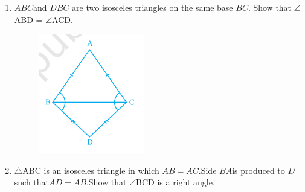 \documentclass[12pt]{article}
\begin{document}
\begin{enumerate}
\begin{figure}[!h]
	\caption{}                                     
\label{fig:Fig1}
\end{figure}
\item $ABC$and $DBC$ are two isosceles triangles on the same base $BC$. Show that
$\angle$ABD = $\angle$ACD.
\begin{figure}[!h]
\begin{center}
\includegraphics[width=\columnwidth]{./figs/triangle6.png}
\end{center}                                      \caption{}                                        \label{fig:Fig1}                                  \end{figure}
\item$\triangle$ABC is an isosceles triangle in which $AB = AC$.Side $BA $is produced to $D$ such that$ AD = AB$.Show that $\angle$BCD is a right angle.
	\begin{figure}[!h]
\begin{center}

\end{center}
\end{figure}
\end{enumerate}
\end{document}
